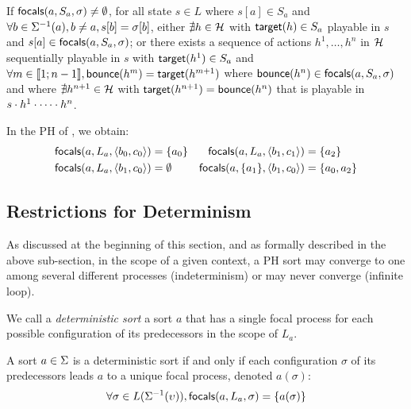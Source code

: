 \begin{property}
\label{pro:has-focals}
If $\mathsf{focals}(a,S_a,\sigma)\neq\emptyset$, for all
state $s\in L$
where
$s[a]\in S_a$ and
$\forall b\in \Sigma^{-1}(a), b\neq a, s[b] = \sigma[b]$,
either
$\nexists h\in\mathcal{H}$ with $\mathsf{target}(h)\in S_a$  playable in $s$ and
$s[a]\in\mathsf{focals}(a,S_a,\sigma)$;
or
there exists a sequence of actions $h^1,\dots,h^n$ in $\mathcal{H}$ sequentially playable in $s$ with
$\mathsf{target}(h^1)\in S_a$ and
$\forall m\in\llbracket 1 ; n-1 \rrbracket, \mathsf{bounce}(h^m)=\mathsf{target}(h^{m+1})$
where
 $\mathsf{bounce}(h^n) \in \mathsf{focals}(a,S_a,\sigma)$
 and
 where 
$\nexists h^{n+1}\in \mathcal{H}$ with $\mathsf{target}(h^{n+1})=\mathsf{bounce}(h^n)$ 
that is playable in $s\cdot h^1\cdot \cdots \cdot h^n$.
\end{property}



\begin{example}
In the PH of , we obtain:
\begin{align*}
\mathsf{focals}(a,L_a,\langle b_0,c_0 \rangle) &= \{ a_0 \}
&
\mathsf{focals}(a,L_a,\langle b_1,c_1 \rangle) &= \{ a_2 \}
\\
\mathsf{focals}(a,L_a,\langle b_1,c_0 \rangle) &= \emptyset
&
\mathsf{focals}(a,\{a_1\},\langle b_1,c_0 \rangle) &= \{ a_0, a_2 \}
\end{align*}
\end{example}

\subsection{Restrictions for Determinism} %
\label{ssec:dfocals}

As discussed at the beginning of this section, and as formally described in the above sub-section, 
in the scope of a given context,
a PH sort may converge to one among several different processes (indeterminism) or may never converge
(infinite loop).

We call a \emph{deterministic sort}  a sort $a$
that has a single focal process for each possible configuration of its predecessors in the scope of
$L_a$.

\begin{definition}\label{def:deterministic-sort}
A sort $a\in\Sigma$ is a deterministic sort if and only if
each configuration $\sigma$ of its predecessors leads $a$ to a unique focal process,
denoted $a(\sigma)$:
\[
\forall \sigma \in L(\Sigma^{-1}(\upsilon)),
\mathsf{focals}(a,L_a,\sigma) = \{ a(\sigma) \}\]
\end{definition}

